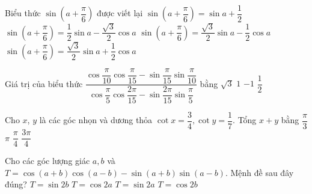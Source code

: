 \begin{ex}[c]%
	Biểu thức  $\sin \left(a+\dfrac{\pi}{6}\right)$ được viết lại
	 \choice
		{$\sin \left(a+\dfrac{\pi}{6}\right)=\sin  a+\dfrac{1}{2}$}
		{$\sin \left(a+\dfrac{\pi}{6}\right)=\dfrac{1}{2}\sin a-\dfrac{\sqrt{3}}{2}\cos a$} 
		{$\sin \left(a+\dfrac{\pi}{6}\right)=\dfrac{\sqrt{3}}{2}\sin a-\dfrac{1}{2}\cos  a$}
		 {\True $\sin \left(a+\dfrac{\pi}{6}\right)=\dfrac{\sqrt{3}}{2}\sin a+\dfrac{1}{2}\cos a$}
\end{ex}

\begin{ex}[c]%
	Giá trị của biểu thức $\dfrac{\cos \dfrac{\pi}{10} \cos \dfrac{\pi}{15}-\sin \dfrac{\pi}{15} \sin \dfrac{\pi}{10}}{\cos \dfrac{\pi}{5} \cos \dfrac{2 \pi}{15}-\sin \dfrac{2 \pi}{15} \sin  \dfrac{\pi}{5}}$ bằng
	 \choice
		{\True$ \sqrt{3} $ } 
		 { $ 1 $}
		{$ -1 $  }
		{ $  \dfrac{1}{2} $}
\end{ex}

\begin{ex}[c]%
	Cho $x$, $y$ là các góc nhọn và dương  thỏa $\cot x=\dfrac{3}{4},\cot y=\dfrac{1}{7}$. Tổng $ x+y$ bằng
	\choice 
		{$\dfrac{\pi }{3}$} 
		 {$\pi $}
		 {$\dfrac{\pi }{4}$}
		{\True $\dfrac{3\pi  }{4}$}
\end{ex}

\begin{ex}[c]%
	Cho các góc lượng giác $a,b$  và $T=\cos (a+b)\cos (a-b)-\sin (a+b)\sin (a-b)$. Mệnh đề sau đây đúng?
	 \choice
		 {$T=\sin 2b$}
		 {\True $T=\cos 2a$}
		{$T=\sin  2a$}
		{$T=\cos 2b$} 
\end{ex}

